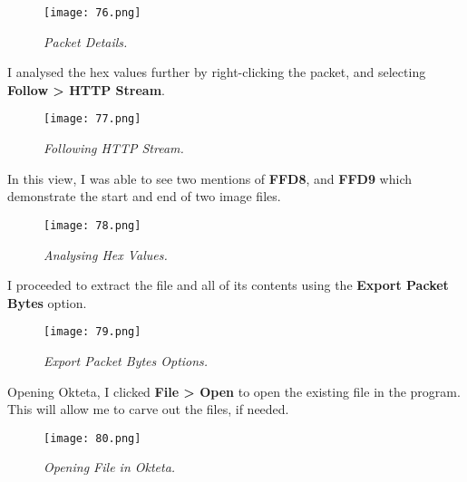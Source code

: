 \begin{figure}[H]
    \setlength{\abovecaptionskip}{20pt}
    \setlength{\belowcaptionskip}{0pt}
    \centering
    \texttt{[image: 76.png]}
    \captionsetup{justification=centering}
    \caption{\textit{Packet Details.}}
    \label{fig:76}
\end{figure}
\vspace{-10pt}

I analysed the hex values further by right-clicking the packet, and selecting \textbf{Follow > HTTP Stream}. 

\begin{figure}[H]
    \setlength{\abovecaptionskip}{20pt}
    \setlength{\belowcaptionskip}{0pt}
    \centering
    \texttt{[image: 77.png]}
    \captionsetup{justification=centering}
    \caption{\textit{Following HTTP Stream.}}
    \label{fig:77}
\end{figure}
\vspace{-10pt}

In this view, I was able to see two mentions of \textbf{FFD8}, and \textbf{FFD9} which demonstrate the start and end of two image files.

\begin{figure}[H]
    \setlength{\abovecaptionskip}{20pt}
    \setlength{\belowcaptionskip}{0pt}
    \centering
    \texttt{[image: 78.png]}
    \captionsetup{justification=centering}
    \caption{\textit{Analysing Hex Values.}}
    \label{fig:78}
\end{figure}
\vspace{-10pt}

I proceeded to extract the file and all of its contents using the \textbf{Export Packet Bytes} option. 

\begin{figure}[H]
    \setlength{\abovecaptionskip}{20pt}
    \setlength{\belowcaptionskip}{0pt}
    \centering
    \texttt{[image: 79.png]}
    \captionsetup{justification=centering}
    \caption{\textit{Export Packet Bytes Options.}}
    \label{fig:79}
\end{figure}
\vspace{-10pt}

Opening Okteta, I clicked \textbf{File > Open} to open the existing file in the program. This will allow me to carve out the files, if needed.

\begin{figure}[H]
    \setlength{\abovecaptionskip}{20pt}
    \setlength{\belowcaptionskip}{0pt}
    \centering
    \texttt{[image: 80.png]}
    \captionsetup{justification=centering}
    \caption{\textit{Opening File in Okteta.}}
    \label{fig:80}
\end{figure}
\vspace{-10pt}

